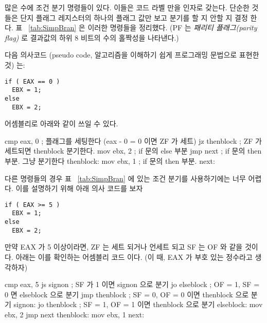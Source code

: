 많은 수에 조건 분기 명령들이 있다. 이들은 코드 라벨 만을 인자로 갖는다. 단순한
것들은 단지 플래그 레지스터의 하나의 플래그 값만 보고 분기를 할 지 안할 지 결정
한다. 표 ~\ref{tab:SimpBran} 은 이러한 명령들을 정리했다. 
(PF 는 \emph{패리티 플래그(parity flag)}  로 결과값의
하위 8 비트의 수의 홀짝성을 나타낸다.) 

다음 의사코드 (pseudo code, 알고리즘을 이해하기 쉽게 프로그래밍 문법으로 
표현한 것) 는:

\begin{Verbatim}
if ( EAX == 0 )
  EBX = 1;
else
  EBX = 2;
\end{Verbatim}
어셈블리로 아래와 같이 쓰일 수 있다.

\begin{AsmCodeListing}[frame=none]
      cmp    eax, 0            ; 플래그를 세팅한다 (eax - 0 = 0 이면 ZF 가 세트)
      jz     thenblock         ; ZF 가 세트되면 thenblock 분기한다. 
      mov    ebx, 2            ; if 문의 else 부분 
      jmp    next              ; if 문의 then 부분. 그냥 분기한다
thenblock:
      mov    ebx, 1            ; if 문의 then 부분. 
next:
\end{AsmCodeListing}

다른 명령들의 경우 표 ~\ref{tab:SimpBran} 에 있는 조건 분기를 사용하기에는
너무 어렵다. 이를 설명하기 위해 아래 의사 코드를 보자

\begin{Verbatim}
if ( EAX >= 5 )
  EBX = 1;
else
  EBX = 2;
\end{Verbatim}
만약 EAX 가 5 이상이라면, ZF 는 세트 되거나 언세트 되고 SF 는 OF 와 같을 것이다.
아래는 이를 확인하는 어셈블리 코드 이다. (이 때, EAX 가 부호 있는 정수라고 
생각하자) 

\begin{AsmCodeListing}[frame=none]
      cmp    eax, 5
      js     signon            ; SF 가 1 이면 signon 으로 분기
      jo     elseblock         ; OF = 1, SF = 0 면 elseblock 으로 분기
      jmp    thenblock         ; SF = 0, OF = 0 이면 thenblock 으로 분기
      signon:
      jo     thenblock         ; SF = 1, OF = 1 이면 thenblock 으로 분기 
elseblock:
      mov    ebx, 2
      jmp    next
thenblock:
      mov    ebx, 1
next:
\end{AsmCodeListing}

